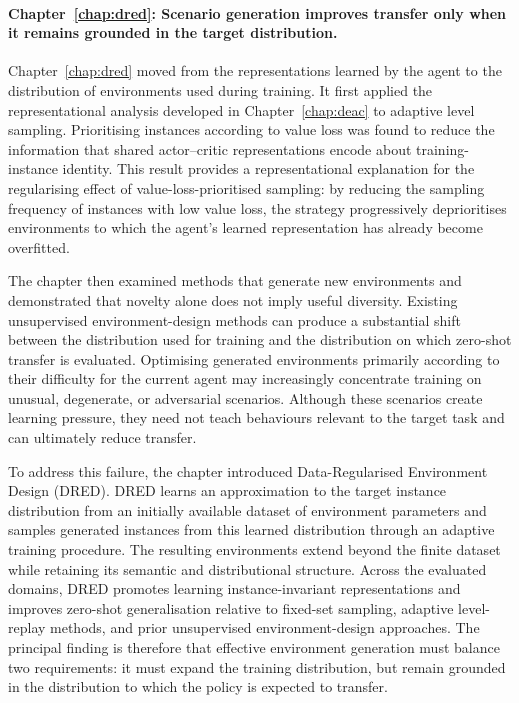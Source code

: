 \paragraph{Chapter~\ref{chap:dred}: Scenario generation improves transfer only when it remains grounded in the target distribution.}
Chapter~\ref{chap:dred} moved from the representations learned by the agent to the distribution of environments used during training. It first applied the representational analysis developed in Chapter~\ref{chap:deac} to adaptive level sampling. Prioritising instances according to value loss was found to reduce the information that shared actor--critic representations encode about training-instance identity. This result provides a representational explanation for the regularising effect of value-loss-prioritised sampling: by reducing the sampling frequency of instances with low value loss, the strategy progressively deprioritises environments to which the agent's learned representation has already become overfitted.

The chapter then examined methods that generate new environments and demonstrated that novelty alone does not imply useful diversity. Existing unsupervised environment-design methods can produce a substantial shift between the distribution used for training and the distribution on which zero-shot transfer is evaluated. Optimising generated environments primarily according to their difficulty for the current agent may increasingly concentrate training on unusual, degenerate, or adversarial scenarios. Although these scenarios create learning pressure, they need not teach behaviours relevant to the target task and can ultimately reduce transfer.

To address this failure, the chapter introduced Data-Regularised Environment Design (\hbox{DRED}). DRED learns an approximation to the target instance distribution from an initially available dataset of environment parameters and samples generated instances from this learned distribution through an adaptive training procedure. The resulting environments extend beyond the finite dataset while retaining its semantic and distributional structure. Across the evaluated domains, DRED promotes learning instance-invariant representations and improves zero-shot generalisation relative to fixed-set sampling, adaptive level-replay methods, and prior unsupervised environment-design approaches. The principal finding is therefore that effective environment generation must balance two requirements: it must expand the training distribution, but remain grounded in the distribution to which the policy is expected to transfer.


